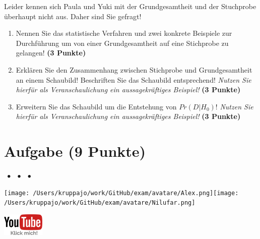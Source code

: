 \documentclass[a4paper, 9pt]{scrartcl}\usepackage[]{graphicx}\usepackage[]{xcolor}
\begin{document}
\vspace{1ex}

Leider kennen sich Paula und Yuki mit der Grundgesamtheit und der Stuchprobe überhaupt nicht aus. Daher sind Sie gefragt!

\begin{enumerate}
\item Nennen Sie das statistische Verfahren und zwei konkrete Beispiele zur Durchführung um von einer Grundgesamtheit auf eine Stichprobe zu gelangen! \textbf{(3 Punkte)}
\item Erklären Sie den Zusammenhang zwischen Stichprobe und Grundgesamtheit an einem Schaubild! Beschriften Sie das Schaubild entsprechend!
  \textit{Nutzen Sie hierfür als Veranschaulichung ein aussagekräftiges Beispiel!}  \textbf{(3 Punkte)}
\item Erweitern Sie das Schaubild um die Entstehung von $Pr(D|H_0)$! \textit{Nutzen Sie hierfür als Veranschaulichung ein aussagekräftiges Beispiel!}  \textbf{(3 Punkte)}
\end{enumerate} 
\clearpage

\section{Aufgabe \hfill (9 Punkte)}


 
\ifcollection
\begin{flushright}
\tiny
\textbf{\examinhaltstart}
\exammodulestat $\;\bullet$
\exammodulestatbbv $\;\bullet$
\exammodulestatversuch $\;\bullet$
\exammodulebiostat
\vspace{-4Ex}
\end{flushright}
\begin{minipage}[t]{0.5\textwidth}
\texttt{[image: /Users/kruppajo/work/GitHub/exam/avatare/Alex.png]}\hspace{-4mm}\texttt{[image: /Users/kruppajo/work/GitHub/exam/avatare/Nilufar.png]}
\end{minipage}
\begin{minipage}[t]{0.5\textwidth}
\hfill
\href{https://youtu.be/Ric8ne39DtI}{\includegraphics[width = 2cm]{img/youtube}}
\end{minipage}
\fi
\end{document}

